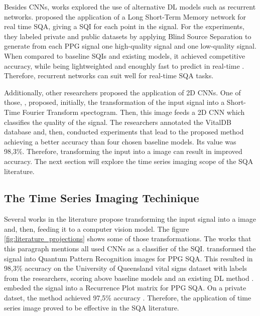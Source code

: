 Besides \acrshort{CNN}s, works explored the use of alternative \acrshort{DL} models such as recurrent networks. \citeauthor{review-11} proposed the application of a Long Short-Term Memory network for real time \acrshort{SQA}, giving a \acrshort{SQI} for each point in the signal. For the experiments, they labeled private and public datasets by applying Blind Source Separation to generate from each \acrshort{PPG} signal one high-quality signal and one low-quality signal. When compared to baseline \acrshort{SQI}s and existing models, it achieved competitive accuracy, while being lightweighted and enoughly fast to predict in real-time \cite{review-11}. Therefore, recurrent networks can suit well for real-time \acrshort{SQA} tasks.

Additionally, other researchers proposed the application of 2D \acrshort{CNN}s. One of those, \citeauthor{review-12}, proposed, initially, the transformation of the input signal into a Short-Time Fourier Transform spectogram. Then, this image feeds a 2D \acrshort{CNN} which classifies the quality of the signal. The researchers annotated the VitalDB database and, then, conducted experiments that lead to the proposed method achieving a better accuracy than four chosen baseline models. Its value was 98,3\%. Therefore, transforming the input into a image can result in improved accuracy. The next section will explore the time series imaging scope of the \acrshort{SQA} literature.




\subsection{The Time Series Imaging Techinique}
\label{sec:imaging}

Several works in the literature propose transforming the input signal into a image and, then, feeding it to a computer vision model. The figure \ref{fig:literature_projections} shows some of those transformations. The works that this paragraph mentions all used \acrshort{CNN}s as a classifier of the \acrshort{SQI}. \citeauthor{review-13} transformed the signal into Quantum Pattern Recognition images for PPG \acrshort{SQA}. This resulted in 98,3\% accuracy on the University of Queensland vital signs dataset with labels from the researchers, scoring above baseline models and an existing \acrshort{DL} method \cite{review-13}. \citeauthor{review-15} embeded the signal into a Recurrence Plot matrix for PPG \acrshort{SQA}. On a private datset, the method achieved 97,5\% accuracy \cite{review-15}. Therefore, the application of time series image proved to be effective in the \acrshort{SQA} literature.  

